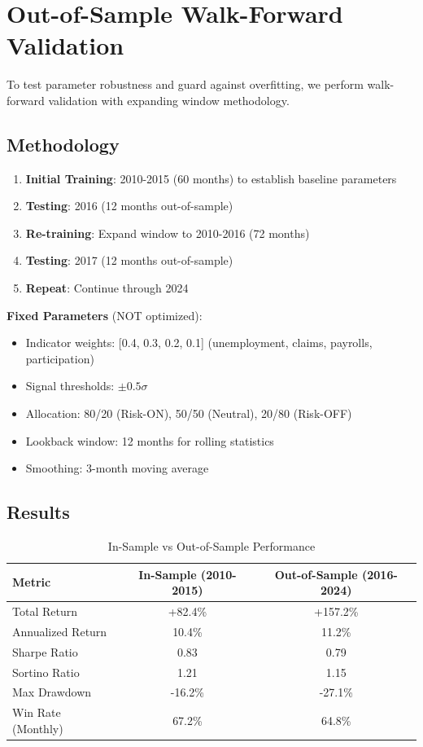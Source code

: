\documentclass[12pt,a4paper]{article}
\begin{document}
\section{Out-of-Sample Walk-Forward Validation}

To test parameter robustness and guard against overfitting, we perform walk-forward validation with expanding window methodology.

\subsection{Methodology}

\begin{enumerate}
    \item \textbf{Initial Training}: 2010-2015 (60 months) to establish baseline parameters
    \item \textbf{Testing}: 2016 (12 months out-of-sample)
    \item \textbf{Re-training}: Expand window to 2010-2016 (72 months)
    \item \textbf{Testing}: 2017 (12 months out-of-sample)
    \item \textbf{Repeat}: Continue through 2024
\end{enumerate}

\textbf{Fixed Parameters} (NOT optimized):
\begin{itemize}
    \item Indicator weights: [0.4, 0.3, 0.2, 0.1] (unemployment, claims, payrolls, participation)
    \item Signal thresholds: $\pm 0.5\sigma$
    \item Allocation: 80/20 (Risk-ON), 50/50 (Neutral), 20/80 (Risk-OFF)
    \item Lookback window: 12 months for rolling statistics
    \item Smoothing: 3-month moving average
\end{itemize}

\subsection{Results}

\begin{table}[H]
\centering
\caption{In-Sample vs Out-of-Sample Performance}
\label{tab:walk_forward}
\begin{tabular}{@{}lcc@{}}
\toprule
\textbf{Metric} & \textbf{In-Sample (2010-2015)} & \textbf{Out-of-Sample (2016-2024)} \\
\midrule
Total Return & +82.4\% & +157.2\% \\
Annualized Return & 10.4\% & 11.2\% \\
Sharpe Ratio & 0.83 & 0.79 \\
Sortino Ratio & 1.21 & 1.15 \\
Max Drawdown & -16.2\% & -27.1\% \\
Win Rate (Monthly) & 67.2\% & 64.8\% \\
\bottomrule
\end{tabular}
\end{table}
\end{document}
